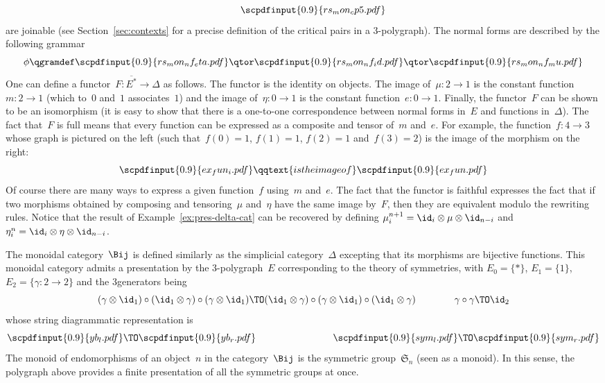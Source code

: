 \documentclass{LMCS}
\newcommand{\strid}[1]{\scpdfinput{0.9}{#1.pdf}}
\begin{document}
\begin{exa}
\[  \qquad
  \strid{rs_mon_cp5}
  \]
  are joinable (see Section~\ref{sec:contexts} for a precise definition of the
  critical pairs in a 3-polygraph). The normal forms are described by the
  following grammar
  \[
  \phi
  \qgramdef
  \strid{rs_mon_nf_eta}
  \qtor
  \strid{rs_mon_nf_id}
  \qtor
  \strid{rs_mon_nf_mu}
  \]
  One can define a functor~$F:\overline{E^*}\to\Delta$ as follows. The
  functor is the identity on objects. The image of~$\mu:2\to 1$ is the constant
  function~$m:2\to 1$ (which to~$0$ and~$1$ associates~$1$) and the image
  of~$\eta:0\to 1$ is the constant function~$e:0\to 1$. Finally, the functor~$F$
  can be shown to be an isomorphism (it is easy to show that there is a
  one-to-one correspondence between normal forms in~$E$ and functions
  in~$\Delta$). The fact that~$F$ is full means that every function can be
  expressed as a composite and tensor of~$m$ and~$e$. For example, the
  function~$f:4\to 3$ whose graph is pictured on the left (such that~$f(0)=1$,
  $f(1)=1$, $f(2)=1$ and~$f(3)=2$) is the image of the morphism on the right:
  \[
  \strid{ex_fun_i}
  \qqtext{is the image of}
  \strid{ex_fun}
  \]
  Of course there are many ways to express a given function~$f$ using~$m$
  and~$e$. The fact that the functor is faithful expresses the fact that if two
  morphisms obtained by composing and tensoring~$\mu$ and~$\eta$ have the same
  image by~$F$, then they are equivalent modulo the rewriting rules. Notice that
  the result of Example~\ref{ex:pres-delta-cat} can be recovered by defining
  $\mu_i^{n+1}=\id_i\otimes\mu\otimes\id_{n-i}$
  and~$\eta_i^n=\id_i\otimes\eta\otimes\id_{n-i}$.
\end{exa}

\begin{exa}
  \label{ex:pres-bij}
  The monoidal category~$\Bij$ is defined similarly as the simplicial
  category~$\Delta$ excepting that its morphisms are bijective functions. This
  monoidal category admits a presentation by the 3-polygraph~$E$ corresponding
  to the theory of symmetries, with \hbox{$E_0=\{*\}$}, $E_1=\{1\}$,
\hbox{$E_2=\{\gamma:2\to 2\}$} and the 3\nbd{}generators being
  \[
  (\gamma\otimes\id_1)\circ(\id_1\otimes\gamma)\circ(\gamma\otimes\id_1)
  \TO
  (\id_1\otimes\gamma)\circ(\gamma\otimes\id_1)\circ(\id_1\otimes\gamma)
  \qquad\qquad
  \gamma\circ\gamma\TO\id_2
  \]
  whose string diagrammatic representation is
  \[
  \strid{yb_l}
  \TO
  \strid{yb_r}
  \qquad\qquad\qquad\qquad
  \strid{sym_l}
  \TO
  \strid{sym_r}
  \]
  The monoid of endomorphisms of an object~$n$ in the category~$\Bij$ is the
  symmetric group~$\mathfrak{S}_n$ (seen as a monoid). In this sense, the
  polygraph above provides a finite presentation of all the symmetric groups at
  once.
\end{exa}
\end{document}
